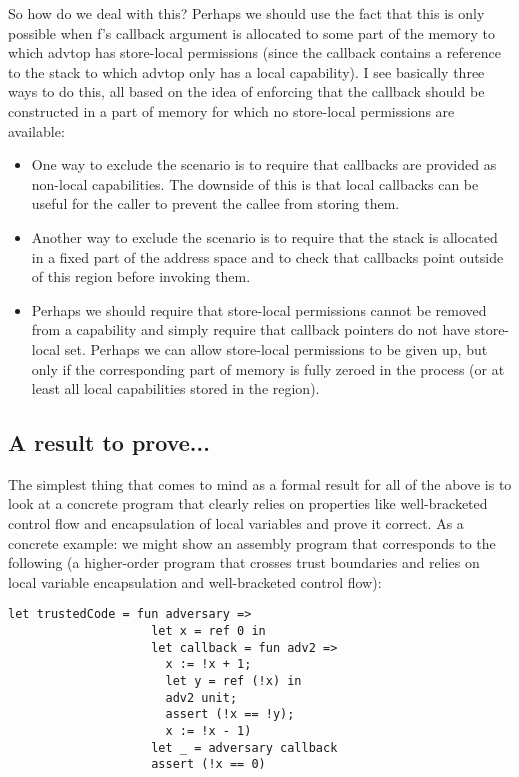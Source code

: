 \documentclass[a4paper]{article}
\newcommand\lau[1]{{\color{purple} \sf \footnotesize {LS: #1}}\\}
\renewcommand\lau[1]{}
\begin{document}
So how do we deal with this? Perhaps we should use the fact that this is only
possible when f's callback argument is allocated to some part of the memory to
which advtop has store-local permissions (since the callback contains a
reference to the stack to which advtop only has a local capability). I see
basically three ways to do this, all based on the idea of enforcing that the
callback should be constructed in a part of memory for which no store-local
permissions are available:
\begin{itemize}
\item One way to exclude the scenario is to require that callbacks are provided
  as non-local capabilities. The downside of this is that local callbacks can be
  useful for the caller to prevent the callee from storing them.
\item Another way to exclude the scenario is to require that the stack is
  allocated in a fixed part of the address space and to check that callbacks
  point outside of this region before invoking them.
\item Perhaps we should require that store-local permissions cannot be removed
  from a capability and simply require that callback pointers do not have
  store-local set. Perhaps we can allow store-local permissions to be given up,
  but only if the corresponding part of memory is fully zeroed in the process
  (or at least all local capabilities stored in the region).
\end{itemize}

\subsection{A result to prove...}
\label{sec:os-less-stack-property}

The simplest thing that comes to mind as a formal result for all of the above is
to look at a concrete program that clearly relies on properties like
well-bracketed control flow and encapsulation of local variables and prove it
correct. As a concrete example: we might show an assembly program that
corresponds to the following (a higher-order program that crosses trust
boundaries and relies on local variable encapsulation and well-bracketed control
flow):
\begin{verbatim}
let trustedCode = fun adversary =>
                    let x = ref 0 in
                    let callback = fun adv2 => 
                      x := !x + 1; 
                      let y = ref (!x) in 
                      adv2 unit; 
                      assert (!x == !y); 
                      x := !x - 1)
                    let _ = adversary callback
                    assert (!x == 0)
\end{verbatim}
\lau{I have inserted some line breaks for readability. not sure what is going on here (the parenthesis after y is unmatched.)}
\end{document}
